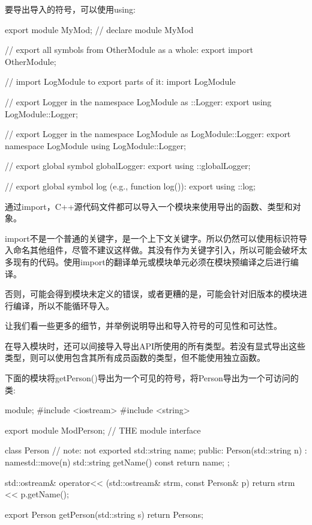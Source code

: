 要导出导入的符号，可以使用using:

\begin{cpp}
export module MyMod; // declare module MyMod

// export all symbols from OtherModule as a whole:
export import OtherModule;

// import LogModule to export parts of it:
import LogModule

// export Logger in the namespace LogModule as ::Logger:
export using LogModule::Logger;

// export Logger in the namespace LogModule as LogModule::Logger:
export namespace LogModule {
	using LogModule::Logger;
}

// export global symbol globalLogger:
export using ::globalLogger;

// export global symbol log (e.g., function log()):
export using ::log;
\end{cpp}



通过import，C++源代码文件都可以导入一个模块来使用导出的函数、类型和对象。

import不是一个普通的关键字，是一个上下文关键字。所以仍然可以使用标识符导入命名其他组件，尽管不建议这样做。其没有作为关键字引入，所以可能会破坏太多现有的代码。使用import的翻译单元或模块单元必须在模块预编译之后进行编译。

否则，可能会得到模块未定义的错误，或者更糟的是，可能会针对旧版本的模块进行编译，所以不能循环导入。



让我们看一些更多的细节，并举例说明导出和导入符号的可见性和可达性。

在导入模块时，还可以间接导入导出API所使用的所有类型。若没有显式导出这些类型，则可以使用包含其所有成员函数的类型，但不能使用独立函数。

下面的模块将getPerson()导出为一个可见的符号，将Person导出为一个可访问的类:


\begin{cpp}
module;
#include <iostream>
#include <string>

export module ModPerson; // THE module interface

class Person { // note: not exported
	std::string name;
public:
	Person(std::string n)
	: name{std::move(n)} {
	}
	std::string getName() const {
		return name;
	}
};

std::ostream& operator<< (std::ostream& strm, const Person& p)
{
	return strm << p.getName();
}

export Person getPerson(std::string s) {
	return Person{s};
}
\end{cpp}

